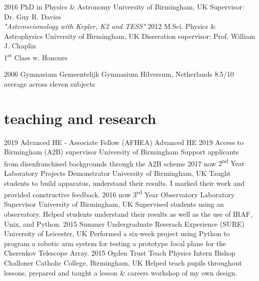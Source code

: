 \documentclass[]{k-cv} %
\begin{document}
\begin{entrylist}
\entry
{2016 }
{PhD {\normalfont in Physics \& Astronomy}}
{University of Birmingham, UK}
{Supervisor: Dr. Guy R. Davies\\
\emph{"Asteroseismology with \textit{Kepler}, K2 and TESS"} \vspace{0.2cm}}
\entry
{2012 }
{M.Sci. {\normalfont Physics \& Astrophysics}}
{University of Birmingham, UK}
{Disseration supervisor: Prof. William J. Chaplin\\
1\textsuperscript{st} Class w. Honours\vspace{0.2cm}}


\entry
{2006 }
{Gymnasium}
{Gemeentelijk Gymnasium Hilversum, Netherlands}
{8.5/10 average across eleven subjects}
\end{entrylist}


\section{teaching and research}
\begin{entrylist}
\entry
{2019}
{Advanced HE - Associate Fellow (AFHEA)}
{Advanced HE}
{}
\entry
{2019}
{Access to Birmingham (A2B) supervisor}
{University of Birmingham}
{Support applicants from disenfranchised backgrounds through the A2B scheme}
\entry
{2017 \to now}
{2\textsuperscript{nd} Year Laboratory Projects Demonstrator}
{University of Birmingham, UK}
{Taught students to build apparatus, understand their results. I marked their work and provided constructive feedback.}
\entry
{2016 \to now}
{3\textsuperscript{rd} Year Observatory Laboratory Supervisor}
{University of Birmingham, UK}
{Supervised students using an observatory. Helped students understand their results as well as the use of IRAF, Unix, and Python.}
\entry
{2015}
{Summer Undergraduate Reserach Experience (SURE)}
{University of Leicester, UK}
{Performed a six-week project using Python to program a robotic arm system for testing a prototype focal plane for the Cherenkov Telescope Array.}
\entry
{2015}
{Ogden Trust Teach Physics Intern}
{Bishop Challoner Catholic College, Birmingham, UK}
{Helped teach pupils throughout lessons, prepared and taught a lesson \& careers workshop of my own
design.}
\end{entrylist}
\end{document}
